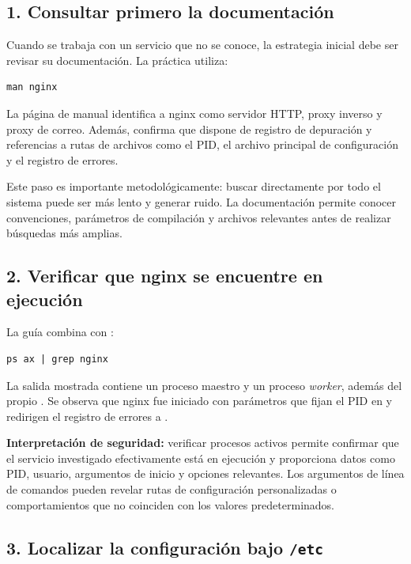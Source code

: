 \documentclass[11pt,a4paper]{article}
\newcommand{\cmd}[1]{\texttt{\detokenize{#1}}}
\newcommand{\ruta}[1]{\path{#1}}
\begin{document}
\subsection{1. Consultar primero la documentación}
Cuando se trabaja con un servicio que no se conoce, la estrategia inicial debe ser revisar su documentación. La práctica utiliza:

\begin{lstlisting}[style=terminal]
man nginx
\end{lstlisting}

La página de manual identifica a nginx como servidor HTTP, proxy inverso y proxy de correo. Además, confirma que dispone de registro de depuración y referencias a rutas de archivos como el PID, el archivo principal de configuración y el registro de errores.

Este paso es importante metodológicamente: buscar directamente por todo el sistema puede ser más lento y generar ruido. La documentación permite conocer convenciones, parámetros de compilación y archivos relevantes antes de realizar búsquedas más amplias.

\subsection{2. Verificar que nginx se encuentre en ejecución}

La guía combina \cmd{ps} con \cmd{grep}:

\begin{lstlisting}[style=terminal]
ps ax | grep nginx
\end{lstlisting}

La salida mostrada contiene un proceso maestro y un proceso \emph{worker}, además del propio \cmd{grep}. Se observa que nginx fue iniciado con parámetros que fijan el PID en \ruta{/run/nginx.pid} y redirigen el registro de errores a \cmd{stderr}.

\textbf{Interpretación de seguridad:} verificar procesos activos permite confirmar que el servicio investigado efectivamente está en ejecución y proporciona datos como PID, usuario, argumentos de inicio y opciones relevantes. Los argumentos de línea de comandos pueden revelar rutas de configuración personalizadas o comportamientos que no coinciden con los valores predeterminados.

\subsection{3. Localizar la configuración bajo \texttt{/etc}}
\end{document}
